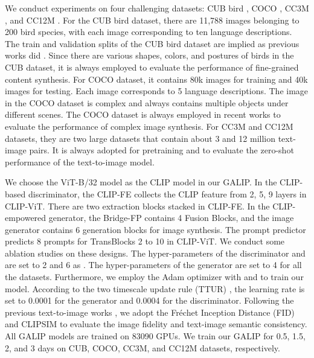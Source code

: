 \documentclass[10pt,twocolumn,letterpaper]{article}
\begin{document}
 We conduct experiments on four challenging datasets: CUB bird \cite{wah2011caltech}, COCO \cite{lin2014microsoft}, CC3M \cite{sharma2018conceptual}, and CC12M \cite{changpinyo2021cc12m}.
For the CUB bird dataset, 
there are 11,788 images belonging to 200 bird species, with each image corresponding to ten language descriptions.
The train and validation splits of the CUB bird dataset are implied as previous works did \cite{zhang2017stackgan, zhang2018stackgan, xu2018attngan, zhu2019dm, tao2020df}.
Since there are various shapes, colors, and postures of birds in the CUB dataset, it is always employed to evaluate the performance of fine-grained content synthesis.
For COCO dataset, 
it contains 80k images for training and 40k images for testing. 
Each image corresponds to 5 language descriptions.
The image in the COCO dataset is complex and always contains multiple objects under different scenes.
The COCO dataset is always employed in recent works to evaluate the performance of complex image synthesis.
For CC3M and CC12M datasets, 
they are two large datasets that contain about 3 and 12 million text-image pairs.
It is always adopted for pretraining and to evaluate the zero-shot performance of the text-to-image model.


We choose the ViT-B/32 \cite{radford2021learning} model as the CLIP model in our GALIP.
In the CLIP-based discriminator, the CLIP-FE collects the CLIP feature from 2, 5, 9 layers in CLIP-ViT.
There are two extraction blocks stacked in CLIP-FE.
In the CLIP-empowered generator, the Bridge-FP contains 4 Fusion Blocks, and the image generator contains 6 generation blocks for  image synthesis.
The prompt predictor predicts 8 prompts for TransBlocks 2 to 10 in CLIP-ViT.
We conduct some ablation studies on these designs.  
The hyper-parameters of the discriminator  and  are set to 2 and 6 as \cite{tao2020df}.
The hyper-parameters of the generator  are set to 4 for all the datasets.
Furthermore, we employ the Adam optimizer \cite{kingma2014adam} with  and  to train our model. 
According to the two timescale update rule (TTUR) \cite{heusel2017gans}, the learning rate is set to 0.0001 for the generator and 0.0004 for the discriminator. 
Following the previous text-to-image works \cite{xu2018attngan, zhu2019dm, tao2020df, wu2021n}, we adopt the Fr\'echet Inception Distance (FID) \cite{heusel2017gans} and CLIPSIM \cite{wu2021n} to evaluate the image fidelity and text-image semantic consistency.
All GALIP models are trained on 83090 GPUs.
We train our GALIP for 0.5, 1.5, 2, and 3 days on CUB, COCO, CC3M, and CC12M datasets, respectively.
\end{document}
